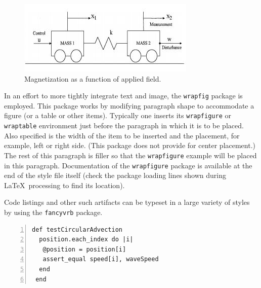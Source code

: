 \documentclass[draft]{aiaa-tc}%
\newcommand{\package}[1]{\texttt{#1}}
\begin{document}
\begin{figure}
 \includegraphics{ACC2}
 \caption{Magnetization as a function of applied field.}
 \label{f:magnetic_field}
\end{figure}

In an effort to more tightly integrate text and image, the
\package{wrapfig} package is employed.
This package works by modifying paragraph shape to accommodate a figure
(or a table or other items).
Typically one inserts its \verb|wrapfigure| or \verb|wraptable|
environment just before the paragraph in which it is to be placed.
Also specified is the width of the item to be inserted and the
placement, for example, left or right side.
(This package does not provide for center placement.)
The rest of this paragraph is filler so that the \verb|wrapfigure|
example will be placed in this paragraph.
Documentation of the \package{wrapfigure} package is available at the
end of the style file itself (check the package loading lines shown
during \LaTeX\ processing to find its location).

Code listings and other such artifacts can be typeset in a large variety
of styles by using the \package{fancyvrb} package.
\begin{Verbatim}[numbers=left]
 def testCircularAdvection
  position.each_index do |i|
   @position = position[i]
   assert_equal speed[i], waveSpeed
  end
 end
\end{Verbatim}
\end{document}

